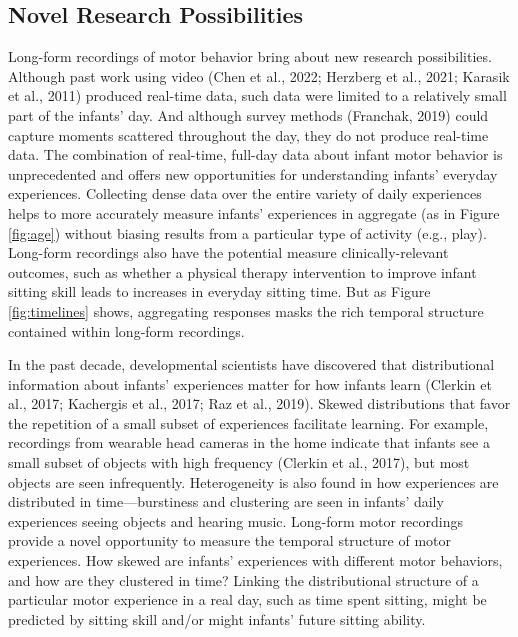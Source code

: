 \documentclass[
  man]{apa6}
\begin{document}
\hypertarget{novel-research-possibilities}{%
\subsection{Novel Research Possibilities}\label{novel-research-possibilities}}

Long-form recordings of motor behavior bring about new research possibilities. Although past work using video (Chen et al., 2022; Herzberg et al., 2021; Karasik et al., 2011) produced real-time data, such data were limited to a relatively small part of the infants' day. And although survey methods (Franchak, 2019) could capture moments scattered throughout the day, they do not produce real-time data. The combination of real-time, full-day data about infant motor behavior is unprecedented and offers new opportunities for understanding infants' everyday experiences. Collecting dense data over the entire variety of daily experiences helps to more accurately measure infants' experiences in aggregate (as in Figure \ref{fig:age}) without biasing results from a particular type of activity (e.g., play). Long-form recordings also have the potential measure clinically-relevant outcomes, such as whether a physical therapy intervention to improve infant sitting skill leads to increases in everyday sitting time. But as Figure \ref{fig:timelines} shows, aggregating responses masks the rich temporal structure contained within long-form recordings.

In the past decade, developmental scientists have discovered that distributional information about infants' experiences matter for how infants learn (Clerkin et al., 2017; Kachergis et al., 2017; Raz et al., 2019). Skewed distributions that favor the repetition of a small subset of experiences facilitate learning. For example, recordings from wearable head cameras in the home indicate that infants see a small subset of objects with high frequency (Clerkin et al., 2017), but most objects are seen infrequently. Heterogeneity is also found in how experiences are distributed in time---burstiness and clustering are seen in infants' daily experiences seeing objects and hearing music. Long-form motor recordings provide a novel opportunity to measure the temporal structure of motor experiences. How skewed are infants' experiences with different motor behaviors, and how are they clustered in time? Linking the distributional structure of a particular motor experience in a real day, such as time spent sitting, might be predicted by sitting skill and/or might infants' future sitting ability.
\end{document}
